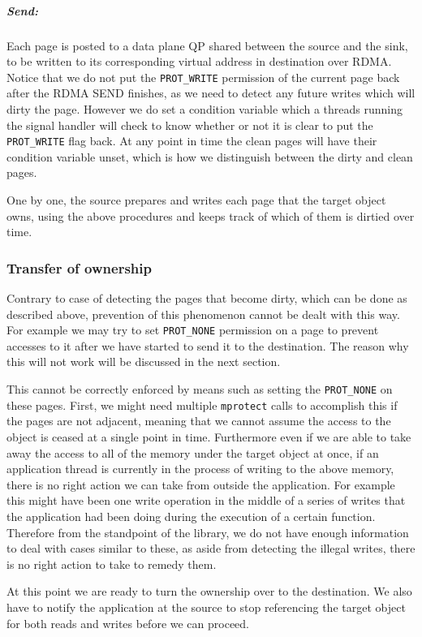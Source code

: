 \subparagraph{Send:} Each page is posted to a data plane QP shared between the
source and the sink, to be written to its corresponding virtual address in
destination over RDMA. Notice that we do not put the \texttt{PROT\_WRITE} permission
of the current page back after the RDMA SEND finishes, as we need to
detect any future writes which will dirty the page.
However we do set a condition variable which a threads running the signal
handler will check to know whether or not it is clear to put the \texttt{PROT\_WRITE} flag back.
At any point in time the clean pages will have their condition variable unset,
which is how we distinguish between the dirty and clean pages.

One by one, the source prepares and writes each page that the target object
owns, using the above procedures and keeps track of which of them is dirtied
over time.

\subsubsection{Transfer of ownership}

Contrary to case of detecting the pages that become dirty, which can be done
as described above, prevention of this phenomenon cannot be dealt with this way.
For example we may try to set \texttt{PROT\_NONE} permission on a page to
prevent accesses to it after we have started to send it to the destination.
The reason why this will not work will be discussed in the next section.


This cannot be correctly enforced by means such as setting the
\texttt{PROT\_NONE} on these pages. First, we might need multiple
\texttt{mprotect} calls to accomplish this if the pages are not adjacent,
meaning that we cannot assume the access to the object is ceased at a single
point in time. Furthermore even if we are able to take away the access to all
of the memory under the target object at once, if an application thread is
currently in the process of writing to the above memory, there is no right
action we can take from outside the application. For example this might have
been one write operation in the middle of a series of writes that the
application had been doing during the execution of a certain function. Therefore
from the standpoint of the library, we do not have enough information to deal
with cases similar to these, as aside from detecting the illegal writes, there
is no right action to take to remedy them.

\label{sec:transferownership}
At this point we are ready to turn the ownership over to the destination.
We also have to notify the application at the source to stop referencing the
target object for both reads and writes before we can proceed.

